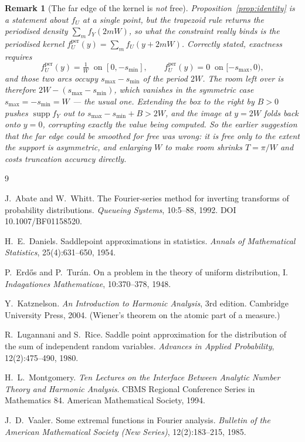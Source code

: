 \documentclass[11pt]{article}
\newtheorem{remark}{Remark}
\begin{document}
\begin{remark}[The far edge of the kernel is \emph{not} free]
\label{rem:kernel}
Proposition~\ref{prop:identity} is a statement about $f_U$ at a single point, but the trapezoid rule
returns the periodised density $\sum_m f_Y(2mW)$, so what the constraint really binds is the
periodised kernel $f_U^{\mathrm{per}}(y)=\sum_m f_U(y+2mW)$. Correctly stated, exactness requires
\[
  f_U^{\mathrm{per}}(y)=\tfrac1W \ \text{ on } [0,-s_{\min}],
  \qquad
  f_U^{\mathrm{per}}(y)=0 \ \text{ on } [-s_{\max},0),
\]
and those two arcs occupy $s_{\max}-s_{\min}$ of the period $2W$. The room left over is therefore
$2W-(s_{\max}-s_{\min})$, which \emph{vanishes} in the symmetric case
$s_{\max}=-s_{\min}=W$ --- the usual one. Extending the box to the right by $B>0$ pushes
$\operatorname{supp}f_Y$ out to $s_{\max}-s_{\min}+B>2W$, and the image at $y=2W$ folds back onto
$y=0$, corrupting exactly the value being computed. So the earlier suggestion that the far edge
could be smoothed for free was wrong: it is free only to the extent the support is asymmetric, and
enlarging $W$ to make room shrinks $T=\pi/W$ and costs truncation accuracy directly.
\end{remark}

\begin{thebibliography}{9}

J.~Abate and W.~Whitt.
\newblock The Fourier-series method for inverting transforms of probability distributions.
\newblock \emph{Queueing Systems}, 10:5--88, 1992. DOI 10.1007/BF01158520.

H.~E.~Daniels.
\newblock Saddlepoint approximations in statistics.
\newblock \emph{Annals of Mathematical Statistics}, 25(4):631--650, 1954.

P.~Erd\H{o}s and P.~Tur\'an.
\newblock On a problem in the theory of uniform distribution, I.
\newblock \emph{Indagationes Mathematicae}, 10:370--378, 1948.

Y.~Katznelson.
\newblock \emph{An Introduction to Harmonic Analysis}, 3rd edition.
\newblock Cambridge University Press, 2004. (Wiener's theorem on the atomic part of a measure.)

R.~Lugannani and S.~Rice.
\newblock Saddle point approximation for the distribution of the sum of independent random
variables.
\newblock \emph{Advances in Applied Probability}, 12(2):475--490, 1980.

H.~L.~Montgomery.
\newblock \emph{Ten Lectures on the Interface Between Analytic Number Theory and Harmonic
Analysis}.
\newblock CBMS Regional Conference Series in Mathematics 84. American Mathematical Society, 1994.

J.~D.~Vaaler.
\newblock Some extremal functions in Fourier analysis.
\newblock \emph{Bulletin of the American Mathematical Society (New Series)}, 12(2):183--215, 1985.

\end{thebibliography}
\end{document}
